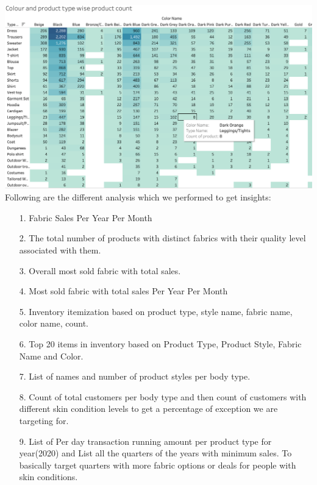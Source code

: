 \documentclass[11pt,journal,compsoc]{IEEEtran}
\begin{document}
\includegraphics[scale=0.13]{images/color.png}
\newline {}\\
\justifying Following are the different analysis which we performed to get insights: 
\begin{itemize}
    \item[1.] Fabric Sales Per Year Per Month
    \item[2.] The total number of products with distinct fabrics with their quality level associated with them.
    \item[3.] Overall most sold fabric with total sales.
    \item[4.] Most sold fabric with total sales Per Year Per Month
    \item[5.] Inventory itemization based on product type, style name, fabric name, color name, count.
    \item[6.] Top 20 items in inventory based on Product Type, Product Style, Fabric Name and Color.
    \item[7.] List of names and number of product styles per body type.
    \item[8.] Count of total customers per body type and then count of customers with different skin condition levels to get a percentage of exception we are targeting for.
    \item[9.] List of Per day transaction running amount per product type for year(2020) and  List all the quarters of the years with minimum sales. To basically target quarters with more fabric options or deals for people with skin conditions.
\end{itemize}
\end{document}
